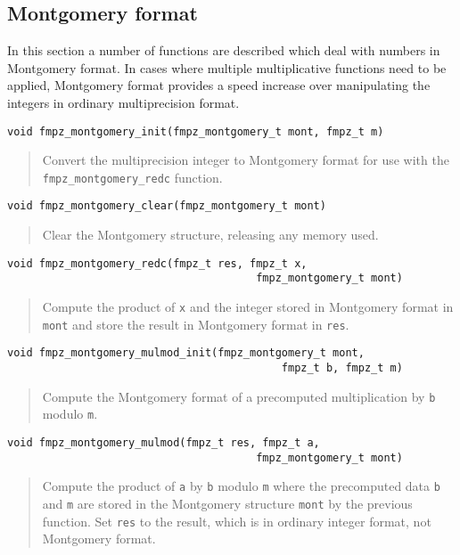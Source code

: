 \documentclass[a4paper,10pt]{article}
\newcommand{\code}{\lstinline}
\begin{document}
\subsection{Montgomery format}

In this section a number of functions are described which deal with numbers in Montgomery format. In cases where multiple multiplicative functions need to be applied, Montgomery format provides a speed increase over manipulating the integers in ordinary multiprecision format.

\begin{lstlisting}
void fmpz_montgomery_init(fmpz_montgomery_t mont, fmpz_t m) 
\end{lstlisting}
\begin{quote}
Convert the multiprecision integer to Montgomery format for use with the \code{fmpz_montgomery_redc} function.
\end{quote}

\begin{lstlisting}
void fmpz_montgomery_clear(fmpz_montgomery_t mont) 
\end{lstlisting}
\begin{quote}
Clear the Montgomery structure, releasing any memory used.
\end{quote}

\begin{lstlisting}
void fmpz_montgomery_redc(fmpz_t res, fmpz_t x, 
                                       fmpz_montgomery_t mont) 
\end{lstlisting}
\begin{quote}
Compute the product of \code{x} and the integer stored in Montgomery format in \code{mont} and store the result in Montgomery format in \code{res}.
\end{quote}

\begin{lstlisting}
void fmpz_montgomery_mulmod_init(fmpz_montgomery_t mont, 
                                           fmpz_t b, fmpz_t m) 
\end{lstlisting}
\begin{quote}
Compute the Montgomery format of a precomputed multiplication by \code{b} modulo \code{m}.
\end{quote}

\begin{lstlisting}
void fmpz_montgomery_mulmod(fmpz_t res, fmpz_t a, 
                                       fmpz_montgomery_t mont)
\end{lstlisting}
\begin{quote}
Compute the product of \code{a} by \code{b} modulo \code{m} where the precomputed data \code{b} and \code{m} are stored in the Montgomery structure \code{mont} by the previous function. Set \code{res} to the result, which is in ordinary integer format, not Montgomery format.
\end{quote}
\end{document}
